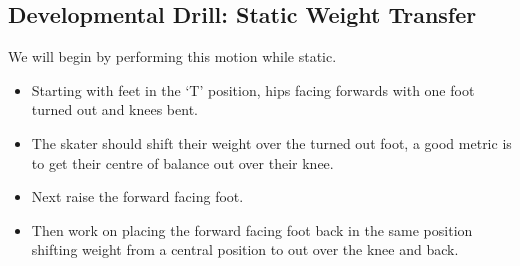 \subsection*{Developmental Drill: Static Weight Transfer}
\label{drill:lateral/book/weight_transfer_static}

We will begin by performing this motion while static.

\begin{itemize}
\item Starting with feet in the `T' position, hips facing forwards with one foot turned out and knees bent.
\item The skater should shift their weight over the turned out foot, a good metric is to get their centre of balance out over their knee. 
\item Next raise the forward facing foot. 
\item Then work on placing the forward facing foot back in the same position shifting weight from a central position to out over the knee and back.
\end{itemize}


%
%
